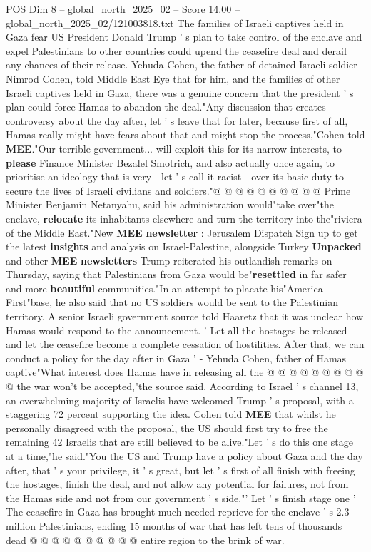 \begin{textsample}{POS Dim 8 – global\_north\_2025\_02 – Score 14.00 – global\_north\_2025\_02/121003818.txt}  \label{ex:f8_pos_011}
The families of Israeli captives held in Gaza fear US President Donald Trump ' s plan to take control of the enclave and expel Palestinians to other countries could upend the ceasefire deal and derail any chances of their release.
Yehuda Cohen, the father of detained Israeli soldier Nimrod Cohen, told Middle East Eye that for him, and the families of other Israeli captives held in Gaza, there was a genuine concern that the president ' s plan could force Hamas to abandon the deal."Any discussion that creates controversy about the day after, let ' s leave that for later, because first of all, Hamas really might have fears about that and might stop the process,"Cohen told \textbf{MEE}."Our terrible government... will exploit this for its narrow interests, to \textbf{please} Finance Minister Bezalel Smotrich, and also actually once again, to prioritise an ideology that is very - let ' s call it racist - over its basic duty to secure the lives of Israeli civilians and soldiers."@ @ @ @ @ @ @ @ @ @ Prime Minister Benjamin Netanyahu, said his administration would"take over"the enclave, \textbf{relocate} its inhabitants elsewhere and turn the territory into the"riviera of the Middle East."New \textbf{MEE} \textbf{newsletter} : Jerusalem Dispatch Sign up to get the latest \textbf{insights} and analysis on Israel-Palestine, alongside Turkey \textbf{Unpacked} and other \textbf{MEE} \textbf{newsletters} Trump reiterated his outlandish remarks on Thursday, saying that Palestinians from Gaza would be"\textbf{resettled} in far safer and more \textbf{beautiful} communities."In an attempt to placate his"America First"base, he also said that no US soldiers would be sent to the Palestinian territory.
A senior Israeli government source told Haaretz that it was unclear how Hamas would respond to the announcement. ' Let all the hostages be released and let the ceasefire become a complete cessation of hostilities.
After that, we can conduct a policy for the day after in Gaza ' - Yehuda Cohen, father of Hamas captive"What interest does Hamas have in releasing all the @ @ @ @ @ @ @ @ @ @ the war won't be accepted,"the source said.
According to Israel ' s channel 13, an overwhelming majority of Israelis have welcomed Trump ' s proposal, with a staggering 72 percent supporting the idea.
Cohen told \textbf{MEE} that whilst he personally disagreed with the proposal, the US should first try to free the remaining 42 Israelis that are still believed to be alive."Let ' s do this one stage at a time,"he said."You the US and Trump have a policy about Gaza and the day after, that ' s your privilege, it ' s great, but let ' s first of all finish with freeing the hostages, finish the deal, and not allow any potential for failures, not from the Hamas side and not from our government ' s side."' Let ' s finish stage one ' The ceasefire in Gaza has brought much needed reprieve for the enclave ' s 2.3 million Palestinians, ending 15 months of war that has left tens of thousands dead @ @ @ @ @ @ @ @ @ @ entire region to the brink of war.

\end{textsample}
